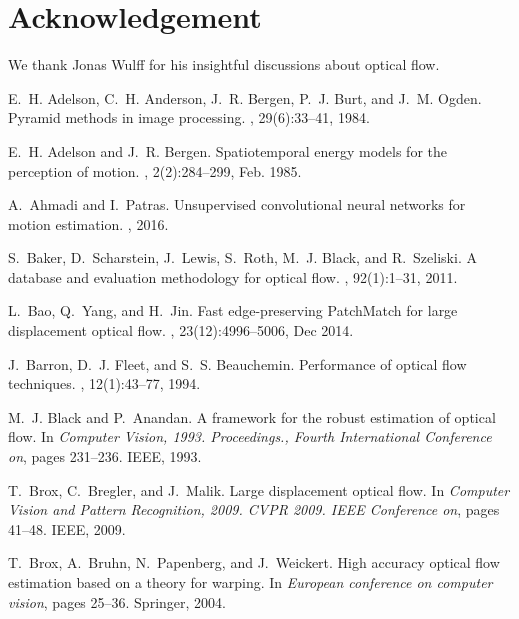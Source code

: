\documentclass[10pt,twocolumn,letterpaper]{article}
\begin{document}
\section*{Acknowledgement}
We thank Jonas Wulff for his insightful discussions about optical flow. 

%
\begin{thebibliography}{10}\itemsep=-1pt

E.~H. Adelson, C.~H. Anderson, J.~R. Bergen, P.~J. Burt, and J.~M. Ogden.
\newblock Pyramid methods in image processing.
, 29(6):33--41, 1984.

E.~H. Adelson and J.~R. Bergen.
\newblock Spatiotemporal energy models for the perception of motion.
, 2(2):284--299, Feb. 1985.

A.~Ahmadi and I.~Patras.
\newblock Unsupervised convolutional neural networks for motion estimation.
, 2016.

S.~Baker, D.~Scharstein, J.~Lewis, S.~Roth, M.~J. Black, and R.~Szeliski.
\newblock A database and evaluation methodology for optical flow.
, 92(1):1--31, 2011.

L.~Bao, Q.~Yang, and H.~Jin.
\newblock Fast edge-preserving {PatchMatch} for large displacement optical
  flow.
, 23(12):4996--5006, Dec
  2014.

J.~Barron, D.~J. Fleet, and S.~S. Beauchemin.
\newblock Performance of optical flow techniques.
, 12(1):43--77, 1994.

M.~J. Black and P.~Anandan.
\newblock A framework for the robust estimation of optical flow.
\newblock In {\em Computer Vision, 1993. Proceedings., Fourth International
  Conference on}, pages 231--236. IEEE, 1993.

T.~Brox, C.~Bregler, and J.~Malik.
\newblock Large displacement optical flow.
\newblock In {\em Computer Vision and Pattern Recognition, 2009. CVPR 2009.
  IEEE Conference on}, pages 41--48. IEEE, 2009.

T.~Brox, A.~Bruhn, N.~Papenberg, and J.~Weickert.
\newblock High accuracy optical flow estimation based on a theory for warping.
\newblock In {\em European conference on computer vision}, pages 25--36.
  Springer, 2004.


\end{thebibliography}
\end{document}
